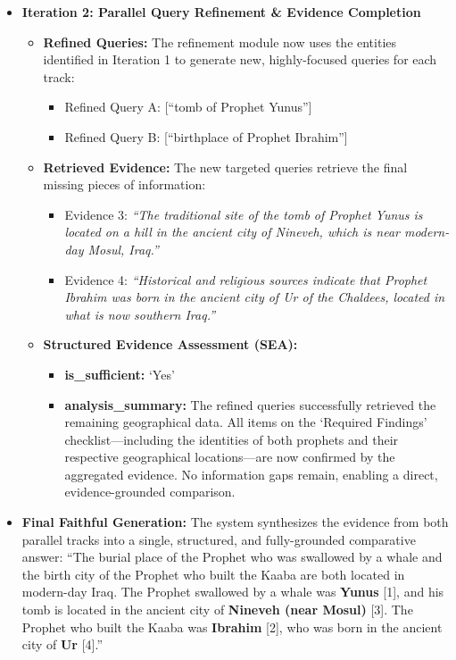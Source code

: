 \documentclass[11pt]{article}
\begin{document}
\begin{itemize}
\item \textbf{Iteration 2: Parallel Query Refinement \& Evidence Completion}
  \begin{itemize}
  \item \textbf{Refined Queries:} The refinement module now uses the entities identified in Iteration 1 to generate new, highly-focused queries for each track:
    \begin{itemize}
    \item Refined Query A: [``tomb of Prophet Yunus'']
    \item Refined Query B: [``birthplace of Prophet Ibrahim'']
    \end{itemize}
  \item \textbf{Retrieved Evidence:} The new targeted queries retrieve the final missing pieces of information:
    \begin{itemize}
    \item Evidence 3: \emph{``The traditional site of the tomb of Prophet Yunus is located on a hill in the ancient city of Nineveh, which is near modern-day Mosul, Iraq.''}
    \item Evidence 4: \emph{``Historical and religious sources indicate that Prophet Ibrahim was born in the ancient city of Ur of the Chaldees, located in what is now southern Iraq.''}
    \end{itemize}
  \item \textbf{Structured Evidence Assessment (SEA):}
    \begin{itemize}
    \item \textbf{is\_sufficient:} `Yes'
    \item \textbf{analysis\_summary:} The refined queries successfully retrieved the remaining geographical data. All items on the `Required Findings' checklist---including the identities of both prophets and their respective geographical locations---are now confirmed by the aggregated evidence. No information gaps remain, enabling a direct, evidence-grounded comparison.
    \end{itemize}
  \end{itemize}

\item \textbf{Final Faithful Generation:}
The system synthesizes the evidence from both parallel tracks into a single, structured, and fully-grounded comparative answer: ``The burial place of the Prophet who was swallowed by a whale and the birth city of the Prophet who built the Kaaba are both located in modern-day Iraq. The Prophet swallowed by a whale was \textbf{Yunus} [1], and his tomb is located in the ancient city of \textbf{Nineveh (near Mosul)} [3]. The Prophet who built the Kaaba was \textbf{Ibrahim} [2], who was born in the ancient city of \textbf{Ur} [4].''
\end{itemize}
\end{document}
